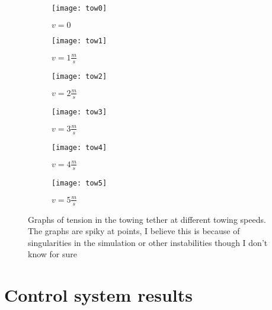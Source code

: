 \begin{figure}
	\centering
	\begin{subfigure}[b]{0.45\textwidth}
		\centering
		\texttt{[image: tow0]}
		\caption{\(v=0\)}
	\end{subfigure}
	\hfill
	\begin{subfigure}[b]{0.45\textwidth}
		\centering
		\texttt{[image: tow1]}
		\caption{\(v=1\frac{m}{s}\)}
	\end{subfigure}
	\vfill
	\begin{subfigure}[b]{0.45\textwidth}
		\centering
		\texttt{[image: tow2]}
		\caption{\(v=2\frac{m}{s}\)}
	\end{subfigure}
	\hfill
	\begin{subfigure}[b]{0.45\textwidth}
		\centering
		\texttt{[image: tow3]}
		\caption{\(v=3\frac{m}{s}\)}
	\end{subfigure}
	\vfill
	\begin{subfigure}[b]{0.45\textwidth}
		\centering
		\texttt{[image: tow4]}
		\caption{\(v=4\frac{m}{s}\)}
	\end{subfigure}
	\hfill
	\begin{subfigure}[b]{0.45\textwidth}
		\centering
		\texttt{[image: tow5]}
		\caption{\(v=5\frac{m}{s}\)}
	\end{subfigure}
	\caption{Graphs of tension in the towing tether at different towing speeds. The graphs are spiky at points, I believe this is because of singularities in the simulation or other instabilities though I don't know for sure}
	\label{fig:tensions}
\end{figure}

\section{Control system results}
